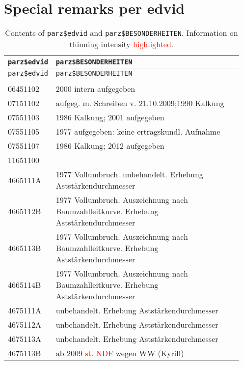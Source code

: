 \section{Special remarks per edvid}

\begin{singlespace}
  {\tabulinesep=2mm
    \begin{longtabu}{p{0.15\linewidth} p{0.8\linewidth}}
      \caption{Contents of \texttt{parz\$edvid} and \texttt{parz\$BESONDERHEITEN}.  Information on thinning intensity \textcolor{red}{highlighted}. \label{tab:special_remarks}} \\
      \toprule
      \texttt{parz\$edvid} & \texttt{parz\$BESONDERHEITEN} \\
      \midrule
      \endfirsthead
      \texttt{parz\$edvid} & \texttt{parz\$BESONDERHEITEN} \\
      \midrule
      \endhead
      \bottomrule
       & \\
      06451102 & 2000  intern aufgegeben \\
      07151102 & aufgeg. m. Schreiben v. 21.10.2009;1990 Kalkung \\
      07551103 & 1986 Kalkung; 2001 aufgegeben \\
      07551105 & 1977 aufgegeben:  keine ertragskundl. Aufnahme \\
      07551107 & 1986 Kalkung; 2012 aufgegeben \\
      11651100 & \\
      4665111A & 1977 Vollumbruch. unbehandelt. Erhebung Aststärkendurchmesser \\
      4665112B & 1977 Vollumbruch. Auszeichnung nach Baumzahlleitkurve. Erhebung Aststärkendurchmesser \\
      4665113B & 1977 Vollumbruch. Auszeichnung nach Baumzahlleitkurve. Erhebung Aststärkendurchmesser \\
      4665114B & 1977 Vollumbruch. Auszeichnung nach Baumzahlleitkurve. Erhebung Aststärkendurchmesser \\
      4675111A & unbehandelt. Erhebung Aststärkendurchmesser \\
      4675112A & unbehandelt. Erhebung Aststärkendurchmesser \\
      4675113A & unbehandelt. Erhebung Aststärkendurchmesser \\
      4675113B & ab 2009 \textcolor{red}{st. NDF} wegen WW (Kyrill) \\

\end{longtabu}}
\end{singlespace}
